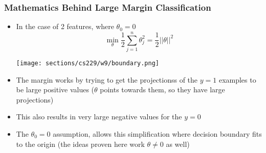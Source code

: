 \subsubsection{Mathematics Behind Large Margin Classification}
\begin{itemize}[--]
	\item In the case of 2 features, where $\theta_0=0$
		$$\min_{\theta}\frac{1}{2}\sum_{j=1}^{n}\theta_j^2=\frac{1}{2}||\theta||^2$$

		\begin{center}
			\texttt{[image: sections/cs229/w9/boundary.png]}
		\end{center}

	\item The margin works by trying to get the projectionss of the $y=1$ examples to be large positive values ($\theta$ points towards them, so they have large projections)
	\item This also results in very large negative values for the $y=0$
	\item The $\theta_0 = 0$ assumption, allows this simplification where decision boundary fits to the origin (the ideas proven here work $\theta\neq 0$ as well)
\end{itemize}

